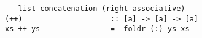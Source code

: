 \begin{verbatim}
-- list concatenation (right-associative)
(++)                    :: [a] -> [a] -> [a]
xs ++ ys                =  foldr (:) ys xs
\end{verbatim}